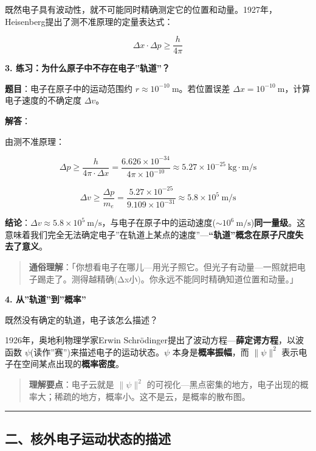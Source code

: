 既然电子具有波动性，就不可能同时精确测定它的位置和动量。1927年，Heisenberg提出了测不准原理的定量表达式：

\[
\boxed{\Delta x \cdot \Delta p \geq \frac{h}{4\pi}}
\]

\textbf{3. 练习：为什么原子中不存在电子''轨道''？}

\textbf{题目}：电子在原子中的运动范围约 \(r \approx 10^{-10}\ \mathrm{m}\)。若位置误差 \(\Delta x = 10^{-10}\ \mathrm{m}\)，计算电子速度的不确定度 \(\Delta v\)。

\textbf{解答}：

由测不准原理：

\[\Delta p \geq \frac{h}{4\pi \cdot \Delta x} = \frac{6.626\times 10^{-34}}{4\pi \times 10^{-10}} \approx 5.27\times 10^{-25}\ \mathrm{kg\cdot m/s}\]

\[\Delta v \geq \frac{\Delta p}{m_e} = \frac{5.27\times 10^{-25}}{9.109\times 10^{-31}} \approx 5.8\times 10^5\ \mathrm{m/s}\]

\textbf{结论}：\(\Delta v \approx 5.8\times 10^5\ \mathrm{m/s}\)，与电子在原子中的运动速度(\(\sim 10^6\ \mathrm{m/s}\))\textbf{同一量级}。这意味着我们完全无法确定电子''在轨道上某点的速度''---\textbf{``轨道''概念在原子尺度失去了意义}。

\begin{quote}
\textbf{通俗理解}：「你想看电子在哪儿---用光子照它。但光子有动量---一照就把电子踢走了。测得越精确(Δx小)。你永远不能同时精确知道位置和动量。」
\end{quote}

\textbf{4. 从''轨道''到''概率''}

既然没有确定的轨道，电子该怎么描述？

1926年，奥地利物理学家Erwin Schrödinger提出了波动方程---\textbf{薛定谔方程}，以波函数 \(\psi\)(读作''赛'')来描述电子的运动状态。\(\psi\) 本身是\textbf{概率振幅}，而 \(\|\psi\|^2\) 表示电子在空间某点出现的\textbf{概率密度}。

\begin{quote}
\textbf{理解要点}：电子云就是 \(\|\psi\|^2\) 的可视化---黑点密集的地方，电子出现的概率大；稀疏的地方，概率小。这不是云，是概率的散布图。
\end{quote}

\begin{center}\rule{0.5\linewidth}{0.5pt}\end{center}

\subsection{二、核外电子运动状态的描述}\label{ux4e8cux6838ux5916ux7535ux5b50ux8fd0ux52a8ux72b6ux6001ux7684ux63cfux8ff0}


